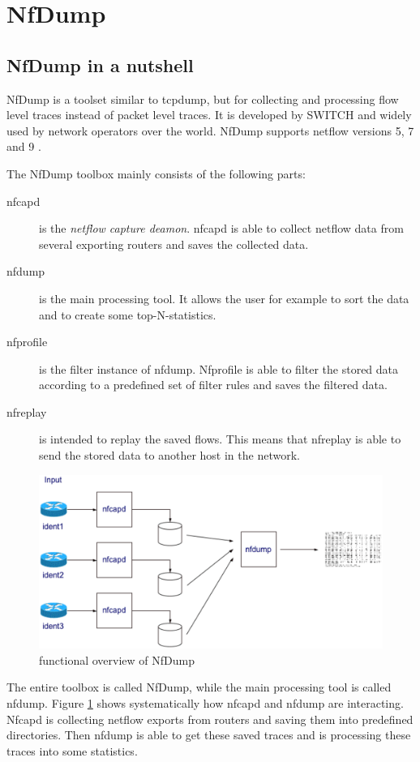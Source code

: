 \section{NfDump}

\subsection{NfDump in a nutshell} NfDump is a toolset similar to tcpdump, but
for collecting and processing flow level traces instead of packet level traces.
It is developed by SWITCH and widely used by network operators over the world.
NfDump supports netflow versions 5, 7 and 9 \cite{nfdump:SF}.

The NfDump toolbox mainly consists of the following parts:
\begin{description}
	\item[nfcapd] is the \emph{netflow capture deamon}. nfcapd
	is able to collect netflow data from several exporting routers and saves the
	collected data.
	\item[nfdump] is the main processing tool. It allows the user for example to
	sort the data and to create some top-N-statistics.
	\item[nfprofile] is the filter instance of nfdump. Nfprofile is able to filter
	the stored data according to a predefined set of filter rules and saves the
	filtered data.
	\item[nfreplay] is intended to replay the saved flows. This means that nfreplay
	is able to send the stored data to another host in the network.
\end{description}
\begin{figure}
	[ht!] \centering
	\includegraphics[width=160mm]{images/nfdump} \caption{functional overview of
	NfDump \cite{nfdump:SF}} 
	\label{fig:nfdump} 
\end{figure}
The entire toolbox is
called NfDump, while the main processing tool is called nfdump.
Figure \ref{fig:nfdump} shows systematically how nfcapd and nfdump are
interacting. Nfcapd is collecting netflow exports from routers and saving them
into predefined directories. Then nfdump is able to get these saved traces and
is processing these traces into some statistics.

